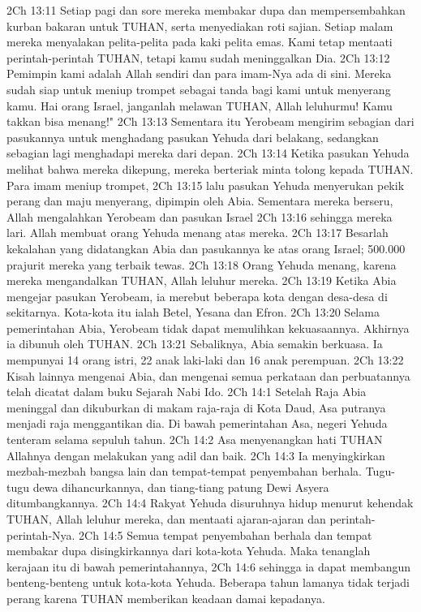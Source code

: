 2Ch 13:11  Setiap pagi dan sore mereka membakar dupa dan mempersembahkan kurban bakaran untuk TUHAN, serta menyediakan roti sajian. Setiap malam mereka menyalakan pelita-pelita pada kaki pelita emas. Kami tetap mentaati perintah-perintah TUHAN, tetapi kamu sudah meninggalkan Dia.
2Ch 13:12  Pemimpin kami adalah Allah sendiri dan para imam-Nya ada di sini. Mereka sudah siap untuk meniup trompet sebagai tanda bagi kami untuk menyerang kamu. Hai orang Israel, janganlah melawan TUHAN, Allah leluhurmu! Kamu takkan bisa menang!"
2Ch 13:13  Sementara itu Yerobeam mengirim sebagian dari pasukannya untuk menghadang pasukan Yehuda dari belakang, sedangkan sebagian lagi menghadapi mereka dari depan.
2Ch 13:14  Ketika pasukan Yehuda melihat bahwa mereka dikepung, mereka berteriak minta tolong kepada TUHAN. Para imam meniup trompet,
2Ch 13:15  lalu pasukan Yehuda menyerukan pekik perang dan maju menyerang, dipimpin oleh Abia. Sementara mereka berseru, Allah mengalahkan Yerobeam dan pasukan Israel
2Ch 13:16  sehingga mereka lari. Allah membuat orang Yehuda menang atas mereka.
2Ch 13:17  Besarlah kekalahan yang didatangkan Abia dan pasukannya ke atas orang Israel; 500.000 prajurit mereka yang terbaik tewas.
2Ch 13:18  Orang Yehuda menang, karena mereka mengandalkan TUHAN, Allah leluhur mereka.
2Ch 13:19  Ketika Abia mengejar pasukan Yerobeam, ia merebut beberapa kota dengan desa-desa di sekitarnya. Kota-kota itu ialah Betel, Yesana dan Efron.
2Ch 13:20  Selama pemerintahan Abia, Yerobeam tidak dapat memulihkan kekuasaannya. Akhirnya ia dibunuh oleh TUHAN.
2Ch 13:21  Sebaliknya, Abia semakin berkuasa. Ia mempunyai 14 orang istri, 22 anak laki-laki dan 16 anak perempuan.
2Ch 13:22  Kisah lainnya mengenai Abia, dan mengenai semua perkataan dan perbuatannya telah dicatat dalam buku Sejarah Nabi Ido.
2Ch 14:1  Setelah Raja Abia meninggal dan dikuburkan di makam raja-raja di Kota Daud, Asa putranya menjadi raja menggantikan dia. Di bawah pemerintahan Asa, negeri Yehuda tenteram selama sepuluh tahun.
2Ch 14:2  Asa menyenangkan hati TUHAN Allahnya dengan melakukan yang adil dan baik.
2Ch 14:3  Ia menyingkirkan mezbah-mezbah bangsa lain dan tempat-tempat penyembahan berhala. Tugu-tugu dewa dihancurkannya, dan tiang-tiang patung Dewi Asyera ditumbangkannya.
2Ch 14:4  Rakyat Yehuda disuruhnya hidup menurut kehendak TUHAN, Allah leluhur mereka, dan mentaati ajaran-ajaran dan perintah-perintah-Nya.
2Ch 14:5  Semua tempat penyembahan berhala dan tempat membakar dupa disingkirkannya dari kota-kota Yehuda. Maka tenanglah kerajaan itu di bawah pemerintahannya,
2Ch 14:6  sehingga ia dapat membangun benteng-benteng untuk kota-kota Yehuda. Beberapa tahun lamanya tidak terjadi perang karena TUHAN memberikan keadaan damai kepadanya.
